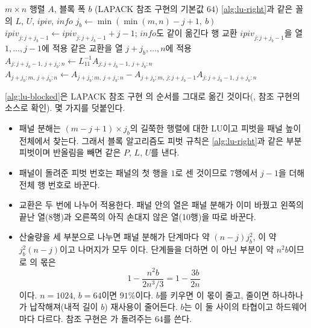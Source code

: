 \begin{algorithm}[htbp]
\begin{algorithmic}[1]
\Require $m\times n$ 행렬 $A$, 블록 폭 $b$ (LAPACK 참조 구현의 기본값 $64$)
\Ensure \cref{alg:lu-right}과 같은 꼴의 $L$, $U$, $\mathit{ipiv}$, $\mathit{info}$
  \State \Return {} 
\EndIf
{}
  \State $j_b\gets\min(\min(m,n)-j+1,\ b)$
  \State {} 
  \State $\mathit{ipiv}_{j:j+j_b-1}\gets\mathit{ipiv}_{j:j+j_b-1}+j-1$; $\mathit{info}$도 같이 옮긴다
  \State 행 교환 $\mathit{ipiv}_{j:j+j_b-1}$을 열 $1,\dots,j-1$에 적용 
    \State 같은 교환을 열 $j+j_b,\dots,n$에 적용 
    \State $A_{j:j+j_b-1,\,j+j_b:n}\gets L_{11}^{-1}A_{j:j+j_b-1,\,j+j_b:n}$ 
      \State $A_{j+j_b:m,\,j+j_b:n}\gets A_{j+j_b:m,\,j+j_b:n}-A_{j+j_b:m,\,j:j+j_b-1}A_{j:j+j_b-1,\,j+j_b:n}$ 
    \EndIf
  \EndIf
\EndFor
\end{algorithmic}
\caption{블록 오른쪽 보기 LU (LAPACK 의 구조를 그대로 옮김)}
\label{alg:lu-blocked}
\end{algorithm}

\cref{alg:lu-blocked}은 LAPACK 참조 구현 의 순서를 그대로 옮긴 것이다(\cite{anderson1999lapack}, 참조 구현의 소스로 확인). 몇 가지를 덧붙인다.
\begin{itemize}
\item 패널 분해는 $(m-j+1)\times j_b$의 길쭉한 행렬에 대한 LU이고 피벗을 패널 높이 전체에서 찾는다. 그래서 블록 알고리즘도 피벗 규칙은 \cref{alg:lu-right}과 같은 부분 피벗이며 반올림을 빼면 같은 $P$, $L$, $U$를 낸다.
\item 패널이 돌려준 피벗 번호는 패널의 첫 행을 $1$로 센 것이므로 7행에서 $j-1$을 더해 전체 행 번호로 바꾼다.
\item 교환은 두 번에 나누어 적용한다. 패널 안의 열은 패널 분해가 이미 바꿨고 왼쪽의 끝난 열(8행)과 오른쪽의 아직 손대지 않은 열(10행)을 따로 바꾼다.
\item 산술량을 세 부분으로 나누면 패널 분해가 단계마다 약 $(n-j)j_b^2$, 이 약 $j_b^2(n-j)$이고 나머지가 모두 이다. 단계들을 더하면 이 아닌 부분이 약 $n^2b$이므로 의 몫은
\[
1-\frac{n^2b}{2n^3/3}=1-\frac{3b}{2n}
\]
이다. $n=1024$, $b=64$이면 $91\%$이다. $b$를 키우면 이 몫이 줄고, 줄이면  하나하나가 납작해져(내적 길이 $b$) 재사용이 줄어든다. $b$는 이 둘 사이의 타협이고 하드웨어마다 다르다. 참조 구현은 가 돌려주는 $64$를 쓴다.
\end{itemize}

